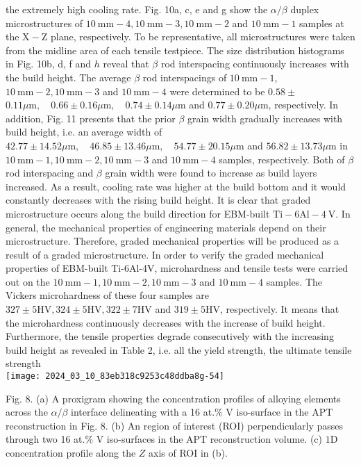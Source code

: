 \documentclass[10pt]{article}
\begin{document}
the extremely high cooling rate. Fig. 10a, c, e and g show the $\alpha / \beta$ duplex microstructures of $10 \mathrm{~mm}-4,10 \mathrm{~mm}-3,10 \mathrm{~mm}-2$ and $10 \mathrm{~mm}-1$ samples at the $\mathrm{X}-\mathrm{Z}$ plane, respectively. To be representative, all microstructures were taken from the midline area of each tensile testpiece. The size distribution histograms in Fig. 10b, d, f and $h$ reveal that $\beta$ rod interspacing continuously increases with the build height. The average $\beta$ rod interspacings of $10 \mathrm{~mm}-1$, $10 \mathrm{~mm}-2,10 \mathrm{~mm}-3$ and $10 \mathrm{~mm}-4$ were determined to be $0.58 \pm$ $0.11 \mu \mathrm{m}, \quad 0.66 \pm 0.16 \mu \mathrm{m}, \quad 0.74 \pm 0.14 \mu \mathrm{m}$ and $0.77 \pm 0.20 \mu \mathrm{m}$, respectively. In addition, Fig. 11 presents that the prior $\beta$ grain width gradually increases with build height, i.e. an average width of $42.77 \pm 14.52 \mu \mathrm{m}, \quad 46.85 \pm 13.46 \mu \mathrm{m}, \quad 54.77 \pm 20.15 \mu \mathrm{m}$ and $56.82 \pm 13.73 \mu \mathrm{m}$ in $10 \mathrm{~mm}-1,10 \mathrm{~mm}-2,10 \mathrm{~mm}-3$ and $10 \mathrm{~mm}-4$ samples, respectively. Both of $\beta$ rod interspacing and $\beta$ grain width were found to increase as build layers increased. As a result, cooling rate was higher at the build bottom and it would constantly decreases with the rising build height. It is clear that graded microstructure occurs along the build direction for EBM-built $\mathrm{Ti}-6 \mathrm{Al}-4 \mathrm{~V}$. In general, the mechanical properties of engineering materials depend on their microstructure. Therefore, graded mechanical properties will be produced as a result of a graded microstructure. In order to verify the graded mechanical properties of EBM-built Ti-6Al-4V, microhardness and tensile tests were carried out on the $10 \mathrm{~mm}-1,10 \mathrm{~mm}-2,10 \mathrm{~mm}-3$ and $10 \mathrm{~mm}-4$ samples. The Vickers microhardness of these four samples are $327 \pm 5 \mathrm{HV}, 324 \pm 5 \mathrm{HV}, 322 \pm 7 \mathrm{HV}$ and $319 \pm 5 \mathrm{HV}$, respectively. It means that the microhardness continuously decreases with the increase of build height. Furthermore, the tensile properties degrade consecutively with the increasing build height as revealed in Table 2, i.e. all the yield strength, the ultimate tensile strength\\
\texttt{[image: 2024\_03\_10\_83eb318c9253c48ddba8g-54]}

Fig. 8. (a) A proxigram showing the concentration profiles of alloying elements across the $\alpha / \beta$ interface delineating with a 16 at.\% V iso-surface in the APT reconstruction in Fig. 8. (b) An region of interest (ROI) perpendicularly passes through two 16 at.\% V iso-surfaces in the APT reconstruction volume. (c) $1 \mathrm{D}$ concentration profile along the $Z$ axis of ROI in (b).
\end{document}
